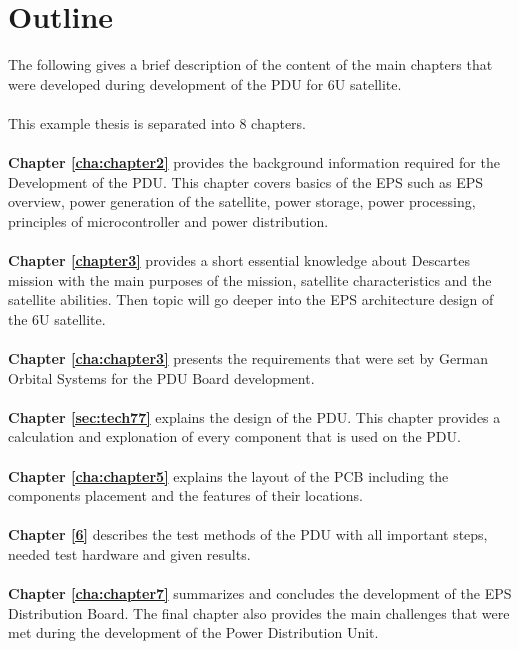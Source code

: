 \section{Outline\label{sec:outline}}

The following gives a brief description of the content of the main chapters that were developed during development of the PDU for 6U satellite.
\\
\\
\noindent This example thesis is separated into 8 chapters.
\\
\\
\textbf{Chapter \ref{cha:chapter2}} provides the background information required for the Development of the PDU. This chapter covers basics of the EPS such as EPS overview, power generation of the satellite, power storage, power processing, principles of microcontroller and power distribution.
\\
\\
\textbf{Chapter \ref{chapter3}} provides a short essential knowledge about Descartes mission with the main purposes of the mission, satellite characteristics and the satellite  abilities. Then topic will go deeper into the EPS architecture design of the 6U satellite.
\\
\\
\textbf{Chapter \ref{cha:chapter3}} presents the requirements that were set by German Orbital Systems for the PDU Board development.
\\
\\
\textbf{Chapter \ref{sec:tech77}} explains the design of the PDU. This chapter provides a calculation and explonation of every component that is used on the PDU. 
\\
\\
\textbf{Chapter \ref{cha:chapter5}} explains the layout of the PCB including the components placement and the features of their locations.
\\
\\
\textbf{Chapter \ref{6}} describes the test methods of the PDU with all important steps, needed test hardware and given results.
\\
\\
\textbf{Chapter \ref{cha:chapter7}} summarizes and concludes the development of the EPS Distribution Board. The final chapter also provides the main challenges that were met during the development of the Power Distribution Unit.